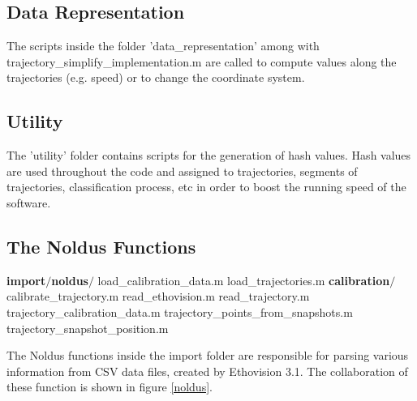 \documentclass[12pt,titlepage]{article}
\newcommand\tab[1][1cm]{\hspace*{#1}}
\begin{document}
\begin{doublespace}
\subsection{Data Representation}
The scripts inside the folder 'data\_representation' among with trajectory\_simplify\_implementation.m are called to compute values along the trajectories (e.g. speed) or to change the coordinate system.

\subsection{Utility}
The 'utility' folder contains scripts for the generation of hash values. Hash values are used throughout the code and assigned to trajectories, segments of trajectories, classification process, etc in order to boost the running speed of the software.

\subsection{The Noldus Functions}

\textbf{import$/$noldus$/$}\linebreak
\tab load\_calibration\_data.m\linebreak
\tab load\_trajectories.m\linebreak
\textbf{\tab calibration$/$}\linebreak
\tab\tab calibrate\_trajectory.m\linebreak
\tab\tab read\_ethovision.m\linebreak
\tab\tab read\_trajectory.m\linebreak
\tab\tab trajectory\_calibration\_data.m\linebreak
\tab\tab trajectory\_points\_from\_snapshots.m\linebreak
\tab\tab trajectory\_snapshot\_position.m\linebreak

The Noldus functions inside the import folder are responsible for parsing various information from CSV data files, created by Ethovision 3.1. The collaboration of these function is shown in figure \ref{noldus}.


\end{doublespace}
\end{document}
